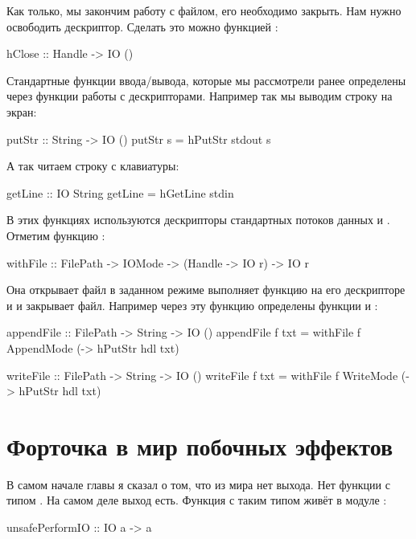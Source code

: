 Как только, мы закончим работу с файлом, его необходимо
закрыть. Нам нужно освободить дескриптор. Сделать это можно
функцией :

\begin{code}
hClose :: Handle -> IO ()
\end{code}

Стандартные функции ввода/вывода, которые мы рассмотрели ранее
определены через функции работы с дескрипторами. 
Например так мы выводим строку на экран:

\begin{code}
putStr          :: String -> IO ()
putStr s        =  hPutStr stdout s
\end{code}

А так читаем строку с клавиатуры:

\begin{code}
getLine         :: IO String
getLine         =  hGetLine stdin
\end{code}

В этих функциях используются дескрипторы стандартных потоков
данных  и . Отметим функцию :

\begin{code}
withFile :: FilePath -> IOMode -> (Handle -> IO r) -> IO r
\end{code}

Она открывает файл в заданном режиме выполняет функцию 
на его дескрипторе и и закрывает файл. Например через 
эту функцию определены функции  и :

\begin{code}
appendFile      :: FilePath -> String -> IO ()
appendFile f txt = withFile f AppendMode (\hdl -> hPutStr hdl txt)

writeFile :: FilePath -> String -> IO ()
writeFile f txt = withFile f WriteMode (\hdl -> hPutStr hdl txt)
\end{code}

\section{Форточка в мир побочных эффектов}

В самом начале главы я сказал о том, что из мира   
нет выхода. Нет функции с типом . На самом
деле выход есть. Функция с таким типом живёт в модуле 
:

\begin{code}
unsafePerformIO :: IO a -> a
\end{code}


